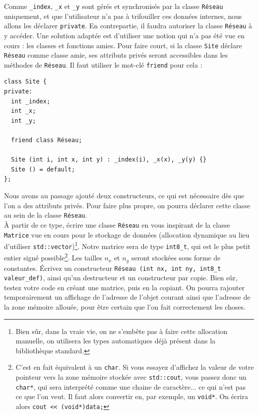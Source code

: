 \documentclass{book}
\newcommand{\inline}[1]{\texttt{#1}}
\begin{document}
Comme \inline{_index}, \inline{_x} et \inline{_y} sont gérés et synchronisés par la classe \inline{Réseau} uniquement, et que l'utilisateur n'a pas à trifouiller ces données internes, nous allons les déclarer \inline{private}. En contrepartie, il faudra autoriser la classe \inline{Réseau} à y accéder. Une solution adaptée est d'utiliser une notion qui n'a pas été vue en cours : les classes et fonctions amies. Pour faire court, si la classe \inline{Site} déclare \inline{Réseau} comme classe amie, ses attributs privés seront accessibles dans les méthodes de \inline{Réseau}. Il faut utiliser le mot-clé \inline{friend} pour cela :
\begin{verbatim}
class Site {
private:
  int _index;
  int _x;
  int _y;

  friend class Réseau;

  Site (int i, int x, int y) : _index(i), _x(x), _y(y) {}
  Site () = default;
};
\end{verbatim}
Nous avons au passage ajouté deux constructeurs, ce qui est nécessaire dès que l'on a des attributs privés. Pour faire plus propre, on pourra déclarer cette classe au sein de la classe \inline{Réseau}.\\

À partir de ce type, écrire une classe \inline{Réseau} en vous inspirant de la classe \inline{Matrice} vue en cours pour le stockage de données (allocation dynamique au lieu d'utiliser \inline{std::vector})\footnote{Bien sûr, dans la vraie vie, on ne s'embête pas à faire cette allocation manuelle, on utilisera les types automatiques déjà présent dans la bibliothèque standard.}. Notre matrice sera de type \inline{int8_t}, qui est le plus petit entier signé possible\footnote{C'est en fait équivalent à un \inline{char}. Si vous essayez d'affichez la valeur de votre pointeur vers la zone mémoire stockée avec \inline{std::cout}, vous passez donc un \inline{char*}, qui sera interprété comme une chaine de caractère... ce qui n'est pas ce que l'on veut. Il faut alors convertir en, par exemple, un \inline{void*}. On écrira alors \inline{cout << (void*)data;}}. Les tailles $n_x$ et $n_y$ seront stockées sous forme de constantes. Écrivez un constructeur \inline{Réseau (int nx, int ny, int8_t valeur_def)}, ainsi qu'un destructeur et un constructeur par copie. Bien sûr, testez votre code en créant une matrice, puis en la copiant. On pourra rajouter temporairement un affichage de l'adresse de l'objet courant ainsi que l'adresse de la zone mémoire allouée, pour être certain que l'on fait correctement les choses.\\
\end{document}
